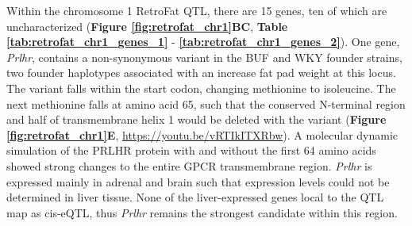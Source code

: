 Within the chromosome 1 RetroFat QTL, there are 15 genes, ten of which are uncharacterized (\textbf{Figure \ref{fig:retrofat_chr1}BC}, \textbf{Table \ref{tab:retrofat_chr1_genes_1}} - \textbf{\ref{tab:retrofat_chr1_genes_2}}).  One gene, \textit{Prlhr}, contains a non-synonymous variant in the BUF and WKY founder strains, two founder haplotypes associated with an increase fat pad weight at this locus. The variant falls within the start codon, changing methionine to isoleucine.  The next methionine falls at amino acid 65, such that the conserved N-terminal region and half of transmembrane helix 1 would be deleted with the variant (\textbf{Figure \ref{fig:retrofat_chr1}E}, \url{https://youtu.be/vRTIkITXRbw}). A molecular dynamic simulation of the PRLHR protein with and without the first 64 amino acids showed strong changes to the entire GPCR transmembrane region. \textit{Prlhr} is expressed mainly in adrenal and brain such that expression levels could not be determined in liver tissue.  None of the liver-expressed genes local to the QTL map as cis-eQTL, thus \textit{Prlhr} remains the strongest candidate within this region.

